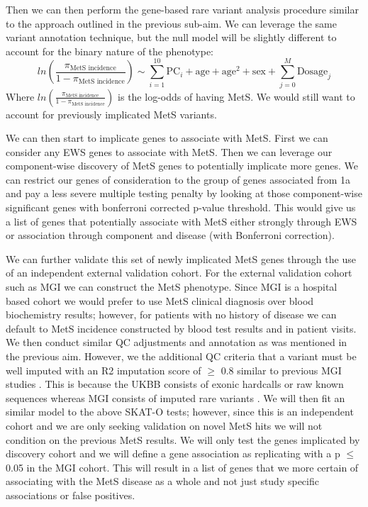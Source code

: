 \documentclass[11pt]{article}
\begin{document}
Then we can then perform the gene-based rare variant analysis procedure similar to the approach outlined in the previous sub-aim. We can leverage the same variant annotation technique, but the null model will be slightly different to account for the binary nature of the phenotype:
$$ln(\frac{\pi_\text{MetS incidence}}{1-\pi_\text{MetS incidence}}) \sim \sum_{i=1}^{10} \text{PC}_i + \text{age} + \text{age}^2 + \text{sex} + \sum_{j=0}^{M}\text{Dosage}_j$$
Where $ln(\frac{\pi_\text{MetS incidence}}{1-\pi_\text{MetS incidence}})$ is the log-odds of having MetS. We would still want to account for previously implicated MetS variants. 

We can then start to implicate genes to associate with MetS. First we can consider any EWS genes to associate with MetS. Then we can leverage our component-wise discovery of MetS genes to potentially implicate more genes. We can restrict our genes of consideration to the group of genes associated from 1a and pay a less severe multiple testing penalty by looking at those component-wise significant genes with bonferroni corrected p-value threshold. This would give us a list of genes that potentially associate with MetS either strongly through EWS or association through component and disease (with Bonferroni correction).

We can further validate this set of newly implicated MetS genes through the use of an independent external validation cohort. For the external validation cohort such as MGI we can construct the MetS phenotype. Since MGI is a hospital based cohort we would prefer to use MetS clinical diagnosis over blood biochemistry results; however, for patients with no history of disease we can default to MetS incidence constructed by blood test results and in patient visits. We then conduct similar QC adjustments and annotation as was mentioned in the previous aim. However, we the additional QC criteria that a variant must be well imputed with an R2 imputation score of $\ge$ 0.8 similar to previous MGI studies \cite{Zawistowski2023}. This is because the UKBB consists of exonic hardcalls or raw known sequences whereas MGI consists of imputed rare variants \cite{pmid34662886,Zawistowski2023}. We will then fit an similar model to the above SKAT-O tests; however, since this is an independent cohort and we are only seeking validation on novel MetS hits we will not condition on the previous MetS results. We will only test the genes implicated by discovery cohort and we will define a gene association as replicating with a p $\le$ 0.05 in the MGI cohort. This will result in a list of genes that we more certain of associating with the MetS disease as a whole and not just study specific associations or false positives.
\end{document}
